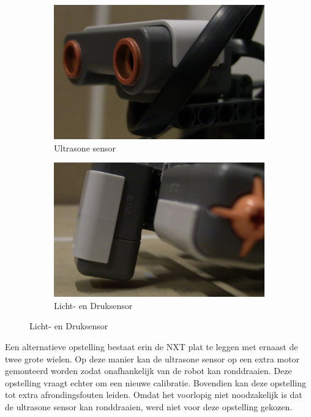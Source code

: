 \documentclass[tt3]{penoverslag}
\begin{document}
\begin{figure}
        \centering
        \begin{subfigure}[h]{0.48\textwidth}
                \centering
                \includegraphics[width=\textwidth]{robotUS}
                \caption{Ultrasone sensor}
                \label{fig:US}
        \end{subfigure}%
        \begin{subfigure}[h]{0.48\textwidth}
                \centering
                \includegraphics[width=\textwidth]{robotLSTS}
                \caption{Licht- en Druksensor}
                \label{fig:LS+TS}
                \end{subfigure}
        \label{fig:sensors}
\end{figure}


Een alternatieve opstelling bestaat erin de NXT plat te leggen met ernaast de twee grote wielen. Op deze manier kan de ultrasone sensor op een extra motor gemonteerd worden zodat onafhankelijk van de robot kan ronddraaien. Deze opstelling vraagt echter om een nieuwe calibratie. Bovendien kan deze opstelling tot extra afrondingsfouten leiden. Omdat het voorlopig niet noodzakelijk is dat de ultrasone sensor kan ronddraaien, werd niet voor deze opstelling gekozen.
\end{document}
